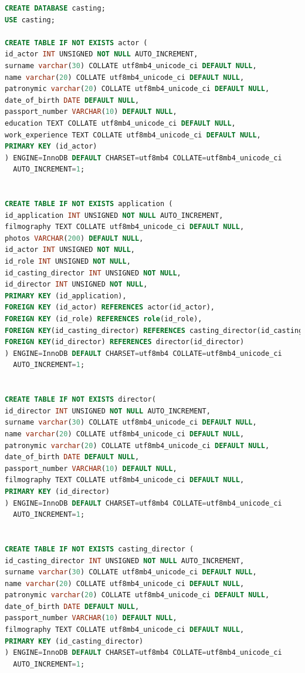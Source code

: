 \documentclass[11pt,a4paper,final]{article} %
\begin{document}
\begin{lstlisting}[language=SQL]
CREATE DATABASE casting;
USE casting;

CREATE TABLE IF NOT EXISTS actor (
id_actor INT UNSIGNED NOT NULL AUTO_INCREMENT,
surname varchar(30) COLLATE utf8mb4_unicode_ci DEFAULT NULL,
name varchar(20) COLLATE utf8mb4_unicode_ci DEFAULT NULL,
patronymic varchar(20) COLLATE utf8mb4_unicode_ci DEFAULT NULL,
date_of_birth DATE DEFAULT NULL,
passport_number VARCHAR(10) DEFAULT NULL,
education TEXT COLLATE utf8mb4_unicode_ci DEFAULT NULL,
work_experience TEXT COLLATE utf8mb4_unicode_ci DEFAULT NULL,
PRIMARY KEY (id_actor)
) ENGINE=InnoDB DEFAULT CHARSET=utf8mb4 COLLATE=utf8mb4_unicode_ci 
  AUTO_INCREMENT=1;


CREATE TABLE IF NOT EXISTS application (
id_application INT UNSIGNED NOT NULL AUTO_INCREMENT,
filmography TEXT COLLATE utf8mb4_unicode_ci DEFAULT NULL,
photos VARCHAR(200) DEFAULT NULL,
id_actor INT UNSIGNED NOT NULL, 
id_role INT UNSIGNED NOT NULL,
id_сasting_director INT UNSIGNED NOT NULL,
id_director INT UNSIGNED NOT NULL,
PRIMARY KEY (id_application),
FOREIGN KEY (id_actor) REFERENCES actor(id_actor), 
FOREIGN KEY (id_role) REFERENCES role(id_role),
FOREIGN KEY(id_сasting_director) REFERENCES casting_director(id_casting_director),
FOREIGN KEY(id_director) REFERENCES director(id_director)
) ENGINE=InnoDB DEFAULT CHARSET=utf8mb4 COLLATE=utf8mb4_unicode_ci 
  AUTO_INCREMENT=1;


CREATE TABLE IF NOT EXISTS director(
id_director INT UNSIGNED NOT NULL AUTO_INCREMENT,
surname varchar(30) COLLATE utf8mb4_unicode_ci DEFAULT NULL,
name varchar(20) COLLATE utf8mb4_unicode_ci DEFAULT NULL,
patronymic varchar(20) COLLATE utf8mb4_unicode_ci DEFAULT NULL,
date_of_birth DATE DEFAULT NULL,
passport_number VARCHAR(10) DEFAULT NULL,
filmography TEXT COLLATE utf8mb4_unicode_ci DEFAULT NULL,
PRIMARY KEY (id_director)
) ENGINE=InnoDB DEFAULT CHARSET=utf8mb4 COLLATE=utf8mb4_unicode_ci 
  AUTO_INCREMENT=1;


CREATE TABLE IF NOT EXISTS casting_director (
id_casting_director INT UNSIGNED NOT NULL AUTO_INCREMENT,
surname varchar(30) COLLATE utf8mb4_unicode_ci DEFAULT NULL,
name varchar(20) COLLATE utf8mb4_unicode_ci DEFAULT NULL,
patronymic varchar(20) COLLATE utf8mb4_unicode_ci DEFAULT NULL,
date_of_birth DATE DEFAULT NULL,
passport_number VARCHAR(10) DEFAULT NULL,
filmography TEXT COLLATE utf8mb4_unicode_ci DEFAULT NULL,
PRIMARY KEY (id_casting_director)
) ENGINE=InnoDB DEFAULT CHARSET=utf8mb4 COLLATE=utf8mb4_unicode_ci 
  AUTO_INCREMENT=1;



\end{lstlisting}
\end{document}
